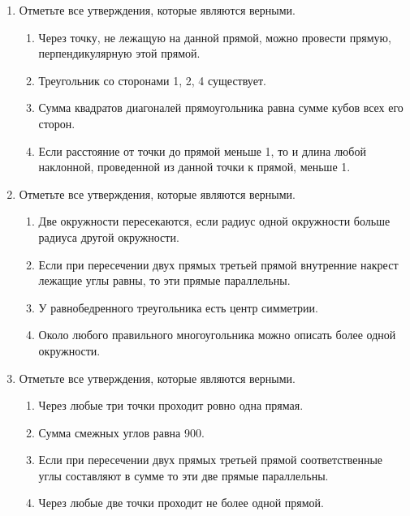 \documentclass[a4paper,12pt]{article}
\newcommand{\taskspace}{\par\vspace{0.42cm}}
\begin{document}
\begin{enumerate}[resume]
\item Отметьте все утверждения, которые являются верными.
\begin{enumerate}[label=\arabic*),leftmargin=8mm,itemsep=0.25em,topsep=0.35em]
\item Через точку, не лежащую на данной прямой, можно провести прямую, перпендикулярную этой прямой.
\item Треугольник со сторонами 1, 2, 4 существует.
\item Сумма квадратов диагоналей прямоугольника равна сумме кубов всех его сторон.
\item Если расстояние от точки до прямой меньше 1, то и длина любой наклонной, проведенной из данной точки к прямой, меньше 1.
\end{enumerate}

\taskspace

\item Отметьте все утверждения, которые являются верными.
\begin{enumerate}[label=\arabic*),leftmargin=8mm,itemsep=0.25em,topsep=0.35em]
\item Две окружности пересекаются, если радиус одной окружности больше радиуса другой окружности.
\item Если при пересечении двух прямых третьей прямой внутренние накрест лежащие углы равны, то эти прямые параллельны.
\item У равнобедренного треугольника есть центр симметрии.
\item Около любого правильного многоугольника можно описать более одной окружности.
\end{enumerate}

\taskspace

\item Отметьте все утверждения, которые являются верными.
\begin{enumerate}[label=\arabic*),leftmargin=8mm,itemsep=0.25em,topsep=0.35em]
\item Через любые три точки проходит ровно одна прямая.
\item Сумма смежных углов равна 900.
\item Если при пересечении двух прямых третьей прямой соответственные углы составляют в сумме то эти две прямые параллельны.
\item Через любые две точки проходит не более одной прямой.
\end{enumerate}


\end{enumerate}
\end{document}
